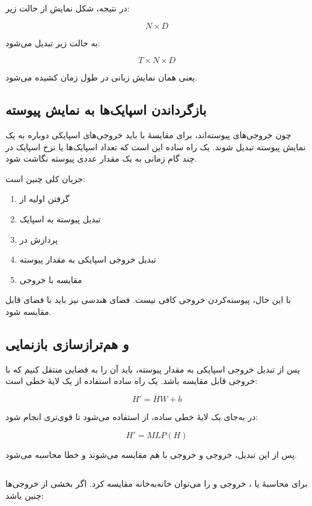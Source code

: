 در نتیجه، شکل نمایش از حالت زیر:

\[
N \times D
\]

به حالت زیر تبدیل می‌شود:

\[
T \times N \times D
\]

یعنی همان نمایش زبانی در طول زمان کشیده می‌شود.

\subsection{بازگرداندن اسپایک‌ها به نمایش پیوسته}
چون خروجی‌های  پیوسته‌اند، برای مقایسهٔ  با  باید خروجی‌های اسپایکی دوباره به یک نمایش پیوسته تبدیل شوند. یک راه ساده این است که تعداد اسپایک‌ها یا نرخ اسپایک در چند گام زمانی به یک مقدار عددی پیوسته نگاشت شود.

جریان کلی چنین است:

\begin{enumerate}
  \item گرفتن  اولیه از 
  \item تبدیل  پیوسته به اسپایک
  \item پردازش در 
  \item تبدیل خروجی اسپایکی به مقدار پیوسته
  \item مقایسه با خروجی 
\end{enumerate}

با این حال، پیوسته‌کردن خروجی کافی نیست. فضای هندسی  نیز باید با فضای  قابل مقایسه شود.

\subsection{ و هم‌ترازسازی بازنمایی}
پس از تبدیل خروجی اسپایکی به مقدار پیوسته، باید آن را به فضایی منتقل کنیم که با خروجی  قابل مقایسه باشد. یک راه ساده استفاده از یک لایهٔ خطی است:

\[
H' = HW + b
\]

در  به‌جای یک لایهٔ خطی ساده، از  استفاده می‌شود تا  قوی‌تری انجام شود:

\[
H' = MLP(H)
\]

پس از این تبدیل، خروجی  و خروجی  با هم مقایسه می‌شوند و خطا محاسبه می‌شود.

\subsection{}
برای محاسبهٔ  یا ، خروجی  و  را می‌توان خانه‌به‌خانه مقایسه کرد. اگر بخشی از خروجی‌ها چنین باشد:

